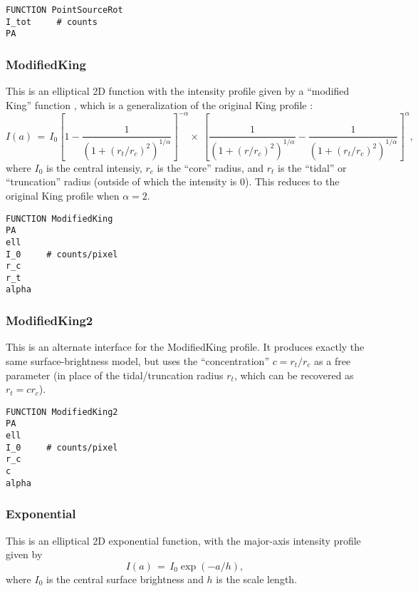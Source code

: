 \documentclass[10pt,a4paper,article]{memoir}
\begin{document}
\begin{verbatim}
FUNCTION PointSourceRot
I_tot     # counts
PA
\end{verbatim}


\subsubsection{ModifiedKing}

This is an elliptical 2D function with the intensity profile given by a 
``modified King'' function \citep{elson99,peng10}, which is a generalization
of the original King profile \citep{king62}:
\begin{equation}
I(a) \, = \, I_{0} \left[1 - \frac{1}{(1 + (r_{t}/r_{c})^{2})^{1/\alpha}} \right]^{-\alpha}
  \times \: \left[ \frac{1}{(1 + (r/r_{c})^{2})^{1/\alpha}} - 
  \frac{1}{(1 + (r_{t}/r_{c})^{2})^{1/\alpha}} \right]^{\alpha},
\end{equation}
where $I_{0}$ is the central intensiy, $r_{c}$ is the ``core'' radius,
and $r_{t}$ is the ``tidal'' or ``truncation'' radius (outside of which
the intensity is 0).
This reduces to the original King profile when $\alpha = 2$.

\begin{verbatim}
FUNCTION ModifiedKing
PA
ell
I_0     # counts/pixel
r_c
r_t
alpha
\end{verbatim}


\subsubsection{ModifiedKing2}

This is an alternate interface for the ModifiedKing profile. It produces
exactly the same surface-brightness model, but uses the
``concentration'' $c = r_t/r_c$ as a free parameter (in place of the
tidal/truncation radius $r_{t}$, which can be recovered as $r_{t} = c r_{c}$).

\begin{verbatim}
FUNCTION ModifiedKing2
PA
ell
I_0     # counts/pixel
r_c
c
alpha
\end{verbatim}




\subsubsection{Exponential}

This is an elliptical 2D exponential function, with the major-axis intensity
profile given by
\begin{equation}
I(a) \, = \, I_{0} \exp(-a/h),
\end{equation}
where $I_{0}$ is the central surface brightness and $h$ is the scale length.
\end{document}
